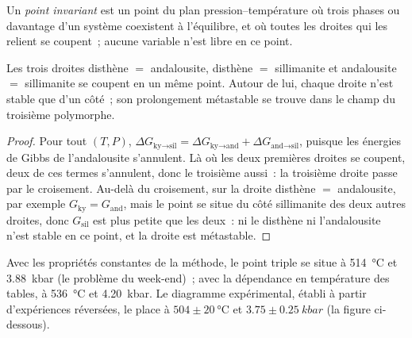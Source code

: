 \begin{definition}\label{def:b2:metamorphic-facies:invariant}
Un \emph{point invariant} est un point du plan pression--température où trois phases
ou davantage d'un système coexistent à l'équilibre, et où toutes les droites  qui les relient se coupent~;
aucune variable n'est libre en ce point.
\end{definition}

\begin{proposition}\label{prop:b2:metamorphic-facies:triple}
Les trois droites disthène $=$ andalousite, disthène $=$ sillimanite et andalousite $=$
sillimanite se coupent en un même point. Autour de lui, chaque droite n'est stable que d'un côté~; son
prolongement métastable se trouve dans le champ du troisième polymorphe.
\end{proposition}

\begin{proof}
Pour tout $(T, P)$, $\Delta G_{\text{ky}\to\text{sil}} = \Delta G_{\text{ky}\to\text{and}} +
\Delta G_{\text{and}\to\text{sil}}$, puisque les énergies de Gibbs de l'andalousite s'annulent. Là où
les deux premières droites se coupent, deux de ces termes s'annulent, donc le troisième aussi~: la troisième
droite passe par le croisement. Au-delà du croisement, sur la droite disthène $=$ andalousite,
par exemple $G_{\text{ky}} = G_{\text{and}}$, mais le point se situe du côté sillimanite des
deux autres droites, donc $G_{\text{sil}}$ est plus petite que les deux~: ni le disthène ni l'andalousite
n'est stable en ce point, et la droite est métastable.
\end{proof}

Avec les propriétés constantes de la méthode, le point triple se situe à
\qty{514}{\celsius} et \qty{3.88}{kbar} (le problème du week-end)~; avec la dépendance en température des tables, à
\qty{536}{\celsius} et \qty{4.20}{kbar}. Le diagramme expérimental, établi à partir d'expériences réversées, le place à
$504 \pm \qty{20}{\celsius}$ et
$3.75 \pm \qty{0.25}{kbar}$ (la figure ci-dessous).

